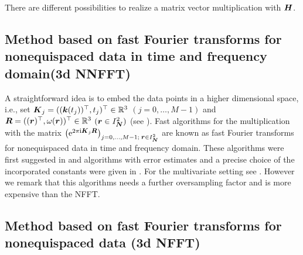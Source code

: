 \documentclass[journal]{IEEEtran}
\def\ti{\mbox{\scriptsize{\rm i}}}
\newcommand{\eip}[1]{{\rm e}^{ 2\pi{\ti} #1}}
\newcommand{\zb}[1]{\mbox{\boldmath{${#1}$}}}
\newcommand{\zbs}[1]{\mbox{\boldmath\scriptsize{${#1}$}}}
\newcommand{\zbss}[1]{\mbox{\boldmath\tiny{${#1}$}}}
\numberwithin{equation}{section}
\numberwithin{table}{section}
\numberwithin{figure}{section}
\begin{document}
There are different possibilities to realize a matrix vector
multiplication with $\zb H$.

\subsection{Method based on fast Fourier transforms for
   nonequispaced data in time {\bf and} frequency domain(3d NNFFT)}
  
A straightforward idea is to embed the data points in a higher
   dimensional space, i.e., set $\zb K_j= ((\zb k(t_j))^{\top},
   t_j)^{\top}\in \mathbb{R}^3$ $(j=0,\ldots, M-1)$ and $\zb R= ((\zb
   r)^{\top}, 
   \omega(\zb r))^{\top}\in \mathbb{R}^3$ $(\zb r\in I_{\zbs N}^2)$ (see
   \cite[Example 2]{LeGr05}). Fast algorithms for the multiplication
   with the matrix $ 
  \left(\eip{\zbs K_j\zbs R}\right)_{j=0,\hdots,M-1;\;\zbs r\in 
  I_{\zbss N}^2}$ are known as fast Fourier transforms for
   nonequispaced data in time and frequency domain. These algorithms were
   first suggested in \cite{duro93} and algorithms with error
   estimates and a precise choice of the incorporated constants were
   given in \cite{ElSt}. For the multivariate setting see
   \cite{postta01}. However we remark that this algorithms needs a
   further oversampling factor and is more expensive than the NFFT.

\subsection{Method based on fast Fourier transforms for
   nonequispaced data (3d NFFT)}
\end{document}
